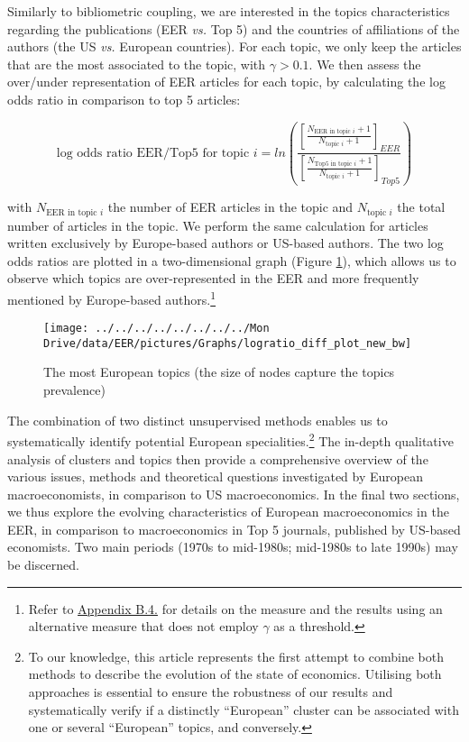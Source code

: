 \documentclass[
  12pt,
  onecolumn]{article}
\begin{document}
Similarly to bibliometric coupling, we are interested in the topics
characteristics regarding the publications (EER \emph{vs.} Top 5) and
the countries of affiliations of the authors (the US \emph{vs.} European
countries). For each topic, we only keep the articles that are the most
associated to the topic, with \(\gamma > 0.1\). We then assess the
over/under representation of EER articles for each topic, by calculating
the log odds ratio in comparison to top 5 articles:

\[
\text{log odds ratio EER/Top5 for topic }i = ln(\frac{[\frac{N_{\text{EER in topic }i}+1}{N_{\text{topic }i} + 1}]_{EER}}{[\frac{N_{\text{Top5 in topic }i}+1}{N_{\text{topic }i} + 1}]_{Top5}})
\]

with \(N_{\text{EER in topic }i}\) the number of EER articles in the
topic and \(N_{\text{topic }i}\) the total number of articles in the
topic. We perform the same calculation for articles written exclusively
by Europe-based authors or US-based authors. The two log odds ratios are
plotted in a two-dimensional graph (Figure \ref{fig:plot-topic-diff}),
which allows us to observe which topics are over-represented in the EER
and more frequently mentioned by Europe-based authors.\footnote{Refer to
  \protect\hyperlink{topic}{Appendix B.4.} for details on the measure
  and the results using an alternative measure that does not employ
  \(\gamma\) as a threshold.}

\begin{figure}[h]

{\centering \texttt{[image: ../../../../../../../../Mon Drive/data/EER/pictures/Graphs/logratio\_diff\_plot\_new\_bw]} 

}

\caption{The most European topics (the size of nodes capture the topics prevalence)}\label{fig:plot-topic-diff}
\end{figure}

\bigskip

The combination of two distinct unsupervised methods enables us to
systematically identify potential European specialities.\footnote{To our
  knowledge, this article represents the first attempt to combine both
  methods to describe the evolution of the state of economics. Utilising
  both approaches is essential to ensure the robustness of our results
  and systematically verify if a distinctly ``European'' cluster can be
  associated with one or several ``European'' topics, and conversely.}
The in-depth qualitative analysis of clusters and topics then provide a
comprehensive overview of the various issues, methods and theoretical
questions investigated by European macroeconomists, in comparison to US
macroeconomics. In the final two sections, we thus explore the evolving
characteristics of European macroeconomics in the EER, in comparison to
macroeconomics in Top 5 journals, published by US-based economists. Two
main periods (1970s to mid-1980s; mid-1980s to late 1990s) may be
discerned.
\end{document}
